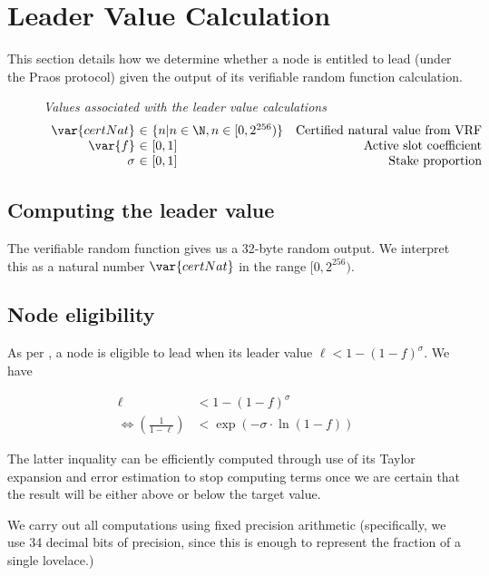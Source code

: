 \section{Leader Value Calculation}
\label{sec:leader-value-calc}

This section details how we determine whether a node is entitled to lead (under
the Praos protocol) given the output of its verifiable random function
calculation.

\begin{figure}
  \emph{Values associated with the leader value calculations}
  \begin{equation*}
  \begin{array}{r@{~\in~}lr}
    \var{certNat} & \{n | n \in \N, n \in [0,2^{256})\} & \text{Certified natural value from VRF} \\
    \var{f} & [0,1] & \text{Active slot coefficient} \\
    \sigma & [0,1] & \text{Stake proportion}
  \end{array}
  \end{equation*}
\end{figure}

\subsection{Computing the leader value}

The verifiable random function gives us a 32-byte random output. We interpret
this as a natural number $\var{certNat}$ in the range $[0,2^{256})$.

\subsection{Node eligibility}

As per \cite{ouroboros_praos}, a node is eligible to lead when its leader value
$\ell < 1 - (1 - f)^\sigma$. We have

\begin{align*}
  \ell & < 1 - (1 -f)^\sigma \\
  \iff \left(\frac{1}{1-\ell}\right) & < \exp{(-\sigma \cdot \ln{(1-f)})}
\end{align*}

The latter inquality can be efficiently computed through use of its Taylor
expansion and error estimation to stop computing terms once we are certain that
the result will be either above or below the target value.

We carry out all computations using fixed precision arithmetic (specifically, we
use 34 decimal bits of precision, since this is enough to represent the fraction
of a single lovelace.)


